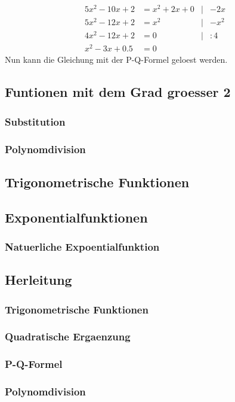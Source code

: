 \documentclass[a4paper]{article} %
\begin{document}
		\begin{align*}
			5x^2-10x+2 &= x^2+2x+0 & 	|&-2x\\
			5x^2-12x+2 &= x^2 & 		|&-x^2\\
			4x^2-12x+2 &= 0   & 		|&:4\\
			x^2-3x+0.5 &= 0 	
		\end{align*}
			Nun kann die Gleichung mit der P-Q-Formel geloest werden.
		\newpage
		\subsection{Funtionen mit dem Grad groesser 2}
		\subsubsection{Substitution}
		\subsubsection{Polynomdivision}
		\subsection{Trigonometrische Funktionen}
		\subsection{Exponentialfunktionen}
		\subsubsection{Natuerliche Expoentialfunktion}
		\subsection{Herleitung}
		\subsubsection{Trigonometrische Funktionen}
		\subsubsection{Quadratische Ergaenzung}
		\subsubsection{P-Q-Formel}
		\subsubsection{Polynomdivision}
\end{document}
